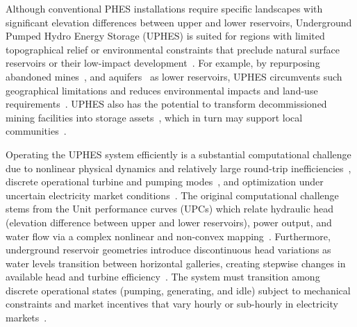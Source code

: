 \documentclass[journal]{IEEEtran}
\begin{document}
Although conventional PHES installations require specific landscapes with significant elevation differences between upper and lower reservoirs, Underground Pumped Hydro Energy Storage (UPHES) is suited for regions with limited topographical relief or environmental constraints that preclude natural surface reservoirs or their low-impact development~\cite{menendez2019pumped}. For example, by repurposing abandoned mines~\cite{winde2017exploring}, and aquifers~\cite{martin2007aquifer} as lower reservoirs, UPHES circumvents such geographical limitations and reduces environmental impacts and land-use requirements~\cite{yang2016pumped}. UPHES also has the potential to transform decommissioned mining facilities into storage assets~\cite{pickard2011history}, which in turn may support local communities~\cite{TASSI2024114467, COLAS2023109153}.

Operating the UPHES system efficiently is a substantial computational challenge due to nonlinear physical dynamics and relatively large round-trip inefficiencies~\cite{emrani2022assessment}, discrete operational turbine and pumping modes~\cite{jia2013mixed}, and optimization under uncertain electricity market conditions~\cite{benini2002day, 7353197}. The original computational challenge stems from the Unit performance curves (UPCs) which relate hydraulic head (elevation difference between upper and lower reservoirs), power output, and water flow via a complex nonlinear and non-convex mapping~\cite{finardi2016assessing}. Furthermore, underground reservoir geometries introduce discontinuous head variations as water levels transition between horizontal galleries, creating stepwise changes in available head and turbine efficiency~\cite{toubeau2019non}. The system must transition among discrete operational states (pumping, generating, and idle) subject to mechanical constraints and market incentives that vary hourly or sub-hourly in electricity markets~\cite{cheng2022hierarchical}.
\end{document}
